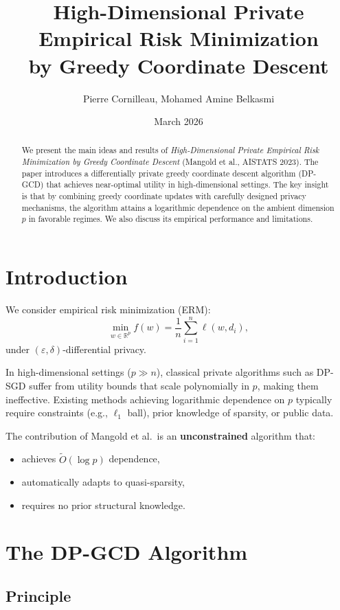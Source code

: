\documentclass[11pt,a4paper]{article}
\title{High-Dimensional Private Empirical Risk Minimization\\
by Greedy Coordinate Descent}
\author{Pierre Cornilleau, Mohamed Amine Belkasmi}
\date{March 2026}
\begin{document}
\maketitle

\begin{abstract}
We present the main ideas and results of \emph{High-Dimensional Private Empirical Risk Minimization by Greedy Coordinate Descent} (Mangold et al., AISTATS 2023). The paper introduces a differentially private greedy coordinate descent algorithm (DP-GCD) that achieves near-optimal utility in high-dimensional settings. The key insight is that by combining greedy coordinate updates with carefully designed privacy mechanisms, the algorithm attains a logarithmic dependence on the ambient dimension $p$ in favorable regimes. We also discuss its empirical performance and limitations.
\end{abstract}

\section{Introduction}

We consider empirical risk minimization (ERM):
\[
\min_{w \in \mathbb{R}^p} f(w) = \frac{1}{n} \sum_{i=1}^{n} \ell(w, d_i),
\]
under $(\varepsilon, \delta)$-differential privacy.

In high-dimensional settings ($p \gg n$), classical private algorithms such as DP-SGD suffer from utility bounds that scale polynomially in $p$, making them ineffective. Existing methods achieving logarithmic dependence on $p$ typically require constraints (e.g., $\ell_1$ ball), prior knowledge of sparsity, or public data.

The contribution of Mangold et al.\ is an \textbf{unconstrained} algorithm that:
\begin{itemize}
\item achieves $\tilde{O}(\log p)$ dependence,
\item automatically adapts to quasi-sparsity,
\item requires no prior structural knowledge.
\end{itemize}

\section{The DP-GCD Algorithm}

\subsection{Principle}
\end{document}

